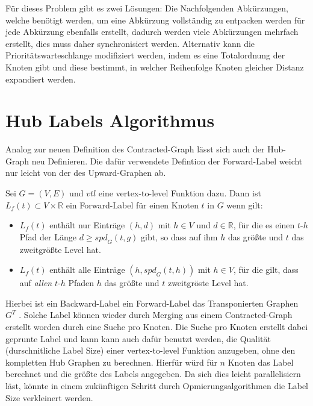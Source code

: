 Für dieses Problem gibt es zwei Lösungen:
Die Nachfolgenden Abkürzungen, welche benötigt werden, um eine Abkürzung vollständig zu entpacken werden für jede Abkürzung ebenfalls erstellt, dadurch werden viele Abkürzungen mehrfach erstellt, dies muss daher synchronisiert werden.
Alternativ kann die Prioritätswarteschlange modifiziert werden, indem es eine Totalordnung der Knoten gibt und diese bestimmt, in welcher Reihenfolge Knoten gleicher Distanz expandiert werden.

\section{Hub Labels Algorithmus}

Analog zur neuen Definition des Contracted-Graph lässt sich auch der Hub-Graph neu Definieren.
Die dafür verwendete Defintion der Forward-Label weicht nur leicht von der des Upward-Graphen ab.

\begin{definition}
  Sei $G = (V, E)$ und ${vtl}$ eine vertex-to-level Funktion dazu.
  Dann ist $L_f (t) \subset V \times \mathbb{R}$ ein Forward-Label für einen Knoten $t$ in $G$ wenn gilt:

  \begin{itemize}
    \item
      $L_f (t)$ enthält nur Einträge $(h, d)$ mit $h \in V$ und $d \in \mathbb{R}$, für die es einen $t$-$h$ Pfad der Länge $d \geq {spd}_G (t, g)$ gibt, so dass auf ihm $h$ das größte und $t$ das zweitgrößte Level hat.

    \item
      $L_f (t)$ enthält alle Einträge $(h, {spd}_G (t, h))$ mit $h \in V$, für die gilt, dass auf \emph{allen} $t$-$h$ Pfaden $h$ das größte und $t$ zweitgröste Level hat.
  \end{itemize}
\end{definition}

Hierbei ist ein Backward-Label ein Forward-Label das Transponierten Graphen $G^T$ .
Solche Label können wieder durch Merging aus einem Contracted-Graph erstellt worden durch eine Suche pro Knoten.
Die Suche pro Knoten erstellt dabei geprunte Label und kann kann auch dafür benutzt werden, die Qualität (durschnitliche Label Size) einer vertex-to-level Funktion anzugeben, ohne den kompletten Hub Graphen zu berechnen.
Hierfür würd für $n$ Knoten das Label berechnet und die größte des Labels angegeben.
Da sich dies leicht parallelisiern läst, könnte in einem zukünftigen Schritt durch Opmierungsalgorithmen die Label Size verkleinert werden.
